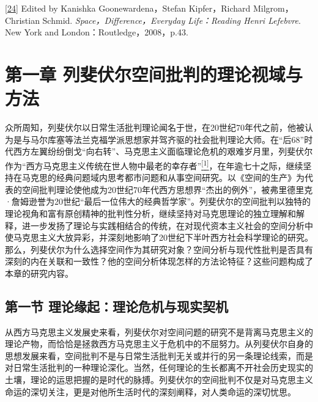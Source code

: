 \documentclass[UTF8, fontset = sourcesans, a4paper, oneside, zihao =
-4, scheme=chinese, no-math, space=true]{ctexbook}
\begin{document}
\protect\hypertarget{part0004.htmlux5cux23m24}{}{}\protect\hyperlink{part0004.htmlux5cux23w24}{{[}24{]}}
Edited by Kanishka Goonewardena，Stefan Kipfer，Richard
Milgrom，Christian Schmid. \emph{Space，Difference，Everyday
Life：Reading Henri Lefebvre}. New York and
London：Routledge，2008，p.43.

\protect\hypertarget{part0005_split_000.html}{}{}

\hypertarget{part0005_split_000.htmlux5cux23a005}{\chapter{第一章
列斐伏尔空间批判的理论视域与方法}\label{part0005_split_000.htmlux5cux23a005}}

众所周知，列斐伏尔以日常生活批判理论闻名于世，在20世纪70年代之前，他被认为是与马尔库塞等法兰克福学派思想家并驾齐驱的社会批判理论大师。在``后68''时代西方左翼纷纷倒戈``向右转''、马克思主义面临理论危机的艰难岁月里，列斐伏尔作为``西方马克思主义传统在世人物中最老的幸存者''\protect\hypertarget{part0005_split_000.htmlux5cux23w1}{}{}\protect\hyperlink{part0005_split_003.htmlux5cux23m1}{\textsuperscript{{[}1{]}}}，在年逾七十之际，继续坚持在马克思的经典问题域内思考都市问题和从事空间研究。以《空间的生产》为代表的空间批判理论使他成为20世纪70年代西方思想界``杰出的例外''，被弗里德里克·詹姆逊誉为20世纪``最后一位伟大的经典哲学家''。列斐伏尔的空间批判以独特的理论视角和富有原创精神的批判性分析，继续坚持对马克思理论的独立理解和解释，进一步发扬了理论与实践相结合的传统，在对现代资本主义社会的空间分析中使马克思主义大放异彩，并深刻地影响了20世纪下半叶西方社会科学理论的研究。那么，列斐伏尔为什么选择空间作为其研究对象？空间分析与现代性批判是否具有深刻的内在关联和一致性？他的空间分析体现怎样的方法论特征？这些问题构成了本章的研究内容。

\protect\hypertarget{part0005_split_001.html}{}{}

\hypertarget{part0005_split_001.htmlux5cux23b001}{\section{第一节
理论缘起：理论危机与现实契机}\label{part0005_split_001.htmlux5cux23b001}}

从西方马克思主义发展史来看，列斐伏尔对空间问题的研究不是背离马克思主义的理论产物，而恰恰是拯救西方马克思主义于危机中的不屈努力。从列斐伏尔自身的思想发展来看，空间批判不是与日常生活批判无关或并行的另一条理论线索，而是对日常生活批判的一种理论深化。当然，任何理论的生长都离不开社会历史现实的土壤，理论的运思把握的是时代的脉搏。列斐伏尔的空间批判不仅是对马克思主义命运的深切关注，更是对他所生活时代的深刻阐释，对人类命运的深切忧思。
\end{document}
